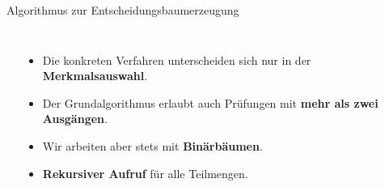 \begin{frame}{Algorithmus zur Entscheidungsbaumerzeugung}
\begin{columns}
\scriptsize
\begin{algorithm}[H]
\caption{Entscheidungsbaum-Erzeugung}
\end{algorithm}

\begin{itemize}
  \item Die konkreten Verfahren unterscheiden sich nur in der \textbf{Merkmalsauswahl}.
  \item Der Grundalgorithmus erlaubt auch Prüfungen mit \textbf{mehr als zwei
        Ausgängen}.
  \item Wir arbeiten aber stets mit \textbf{Binärbäumen}.
  \item \textbf{Rekursiver Aufruf} für alle Teilmengen.
\end{itemize}
\end{columns}
\end{frame}



